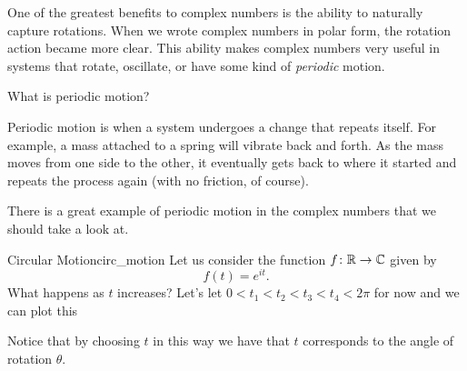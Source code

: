         One of the greatest benefits to complex numbers is the ability to naturally capture rotations.  When we wrote complex numbers in polar form, the rotation action became more clear. This ability makes complex numbers very useful in systems that rotate, oscillate, or have some kind of \emph{periodic} motion.
        
        \begin{question}
                What is periodic motion?
        \end{question}
        
        \begin{answer}
            Periodic motion is when a system undergoes a change that repeats itself.  For example, a mass attached to a spring will vibrate back and forth.  As the mass moves from one side to the other, it eventually gets back to where it started and repeats the process again (with no friction, of course).
        \end{answer}
        
        \noindent There is a great example of periodic motion in the complex numbers that we should take a look at.  
        
        \begin{ex}{Circular Motion}{circ_motion}
            Let us consider the function $f\colon \mathbb{R} \to \mathbb{C}$ given by
            \[
            f(t)=e^{it}.
            \]
            What happens as $t$ increases? Let's let $0<t_1<t_2<t_3<t_4<2\pi$ for now and we can plot this
            \begin{center}
        \end{center}
        Notice that by choosing $t$ in this way we have that $t$ corresponds to the angle of rotation $\theta$. 
        \end{ex}
        
